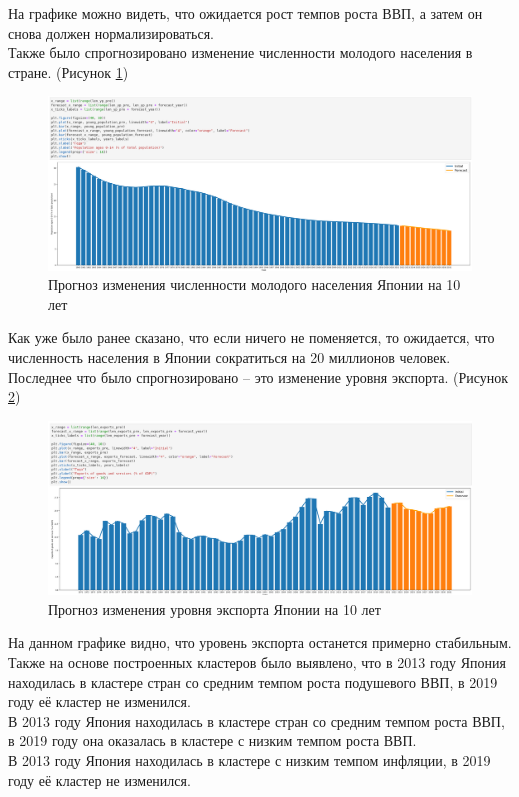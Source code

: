 \documentclass[14pt,fleqn]{extarticle}
\begin{document}
	\newpage
	
	На графике можно видеть, что ожидается рост темпов роста ВВП, а затем он снова должен нормализироваться.\\
	
	Также было спрогнозировано изменение численности молодого населения в стране. (Рисунок \ref{fig:japan_young_population_forecast})
	
	\begin{figure}[h]
		\centering \includegraphics[scale=0.3]{japan_young_population_forecast}
		\caption{Прогноз изменения численности молодого населения Японии на 10 лет}
		\label{fig:japan_young_population_forecast}
	\end{figure}

	Как уже было ранее сказано, что если ничего не поменяется, то ожидается, что численность населения в Японии сократиться на 20 миллионов человек.\\
	
	Последнее что было спрогнозировано -- это изменение уровня экспорта.  (Рисунок \ref{fig:japan_export_forecast})
	
	\begin{figure}[h]
		\centering \includegraphics[scale=0.25]{japan_export_forecast}
		\caption{Прогноз изменения уровня экспорта Японии на 10 лет}
		\label{fig:japan_export_forecast}
	\end{figure}
	
	\newpage
	
	На данном графике видно, что уровень экспорта останется примерно стабильным.\\
	
	Также на основе построенных кластеров было выявлено, что в 2013 году Япония находилась в кластере стран со средним темпом роста подушевого ВВП, в 2019 году её кластер не изменился.\\
	
	В 2013 году Япония находилась в кластере стран со средним темпом роста ВВП, в 2019 году она оказалась в кластере с низким темпом роста ВВП.\\
	
	В 2013 году Япония находилась в кластере с низким темпом инфляции, в 2019 году её кластер не изменился.
\end{document}
